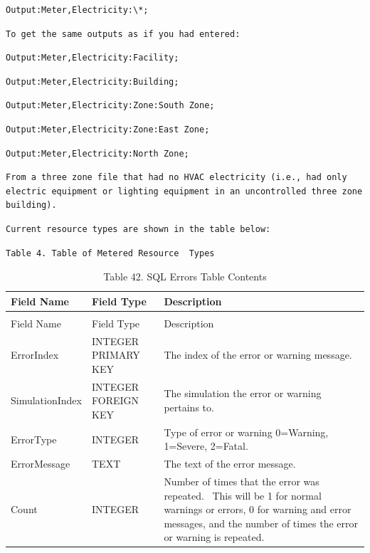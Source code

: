 \begin{lstlisting}
Output:Meter,Electricity:\*;
\end{lstlisting}

\begin{lstlisting}
To get the same outputs as if you had entered:
\end{lstlisting}

\begin{lstlisting}
Output:Meter,Electricity:Facility;
\end{lstlisting}

\begin{lstlisting}
Output:Meter,Electricity:Building;
\end{lstlisting}

\begin{lstlisting}
Output:Meter,Electricity:Zone:South Zone;
\end{lstlisting}

\begin{lstlisting}
Output:Meter,Electricity:Zone:East Zone;
\end{lstlisting}

\begin{lstlisting}
Output:Meter,Electricity:North Zone;
\end{lstlisting}

\begin{lstlisting}
From a three zone file that had no HVAC electricity (i.e., had only electric equipment or lighting equipment in an uncontrolled three zone building).
\end{lstlisting}

\begin{lstlisting}
Current resource types are shown in the table below:
\end{lstlisting}

\begin{lstlisting}
Table 4. Table of Metered Resource  Types
\end{lstlisting}

\begin{longtable}[c]{p{1.5in}p{1.5in}p{2.99in}}
\caption{Table 42. SQL Errors Table Contents \label{table:table-42.-sql-errors-table-contents}} \tabularnewline
\toprule 
Field Name & Field Type & Description \tabularnewline
\midrule
\endfirsthead

\caption[]{Table 42. SQL Errors Table Contents} \tabularnewline
\toprule 
Field Name & Field Type & Description \tabularnewline
\midrule
\endhead

ErrorIndex & INTEGER PRIMARY KEY & The index of the error or warning message. \tabularnewline
SimulationIndex & INTEGER FOREIGN KEY & The simulation the error or warning pertains to. \tabularnewline
ErrorType & INTEGER & Type of error or warning 0=Warning, 1=Severe, 2=Fatal. \tabularnewline
ErrorMessage & TEXT & The text of the error message. \tabularnewline
Count & INTEGER & Number of times that the error was repeated.~ This will be 1 for normal warnings or errors, 0 for warning and error messages, and the number of times the error or warning is repeated. \tabularnewline
\bottomrule
\end{longtable}

